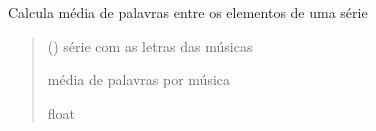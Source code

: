 \documentclass[letterpaper,10pt,english]{sphinxmanual}
\begin{document}

\begin{fulllineitems}
\label{\detokenize{index:functions.words_avg}}
\pysigstartsignatures
{}
\pysigstopsignatures
\sphinxAtStartPar
Calcula média de palavras entre os elementos de uma série
\begin{quote}\begin{description}
\sphinxAtStartPar
{} () \textendash{} série com as letras das músicas

\sphinxAtStartPar
média de palavras por música

\sphinxAtStartPar
float

\end{description}\end{quote}

\end{fulllineitems}

\end{document}
